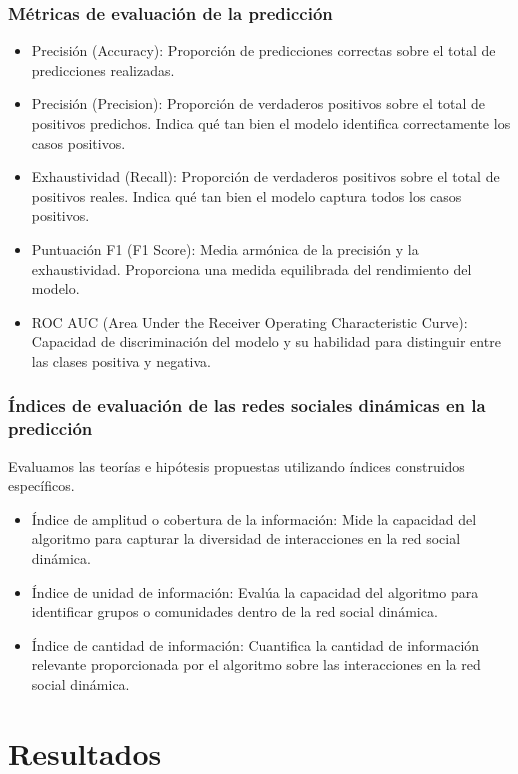 \documentclass{beamer}
\begin{document}
\begin{frame}
	\frametitle{Métricas de evaluación de la predicción}
	\begin{itemize}
		\item Precisión (Accuracy): Proporción de predicciones correctas sobre el total de predicciones realizadas.
		\item Precisión (Precision): Proporción de verdaderos positivos sobre el total de positivos predichos. Indica qué tan bien el modelo identifica correctamente los casos positivos.
		\item Exhaustividad (Recall): Proporción de verdaderos positivos sobre el total de positivos reales. Indica qué tan bien el modelo captura todos los casos positivos.
		\item Puntuación F1 (F1 Score): Media armónica de la precisión y la exhaustividad. Proporciona una medida equilibrada del rendimiento del modelo.
		\item ROC AUC (Area Under the Receiver Operating Characteristic Curve): Capacidad de discriminación del modelo y su habilidad para distinguir entre las clases positiva y negativa.
	\end{itemize}
	
\end{frame}


\begin{frame}
	\frametitle{Índices de evaluación de las redes sociales dinámicas en la predicción}
	\begin{block}{Evaluamos las teorías e hipótesis propuestas utilizando índices construidos específicos.}
	\begin{itemize}
		\item Índice de amplitud o cobertura de la información: Mide la capacidad del algoritmo para capturar la diversidad de interacciones en la red social dinámica.
		\item Índice de unidad de información: Evalúa la capacidad del algoritmo para identificar grupos o comunidades dentro de la red social dinámica.
		\item Índice de cantidad de información: Cuantifica la cantidad de información relevante proporcionada por el algoritmo sobre las interacciones en la red social dinámica.
	\end{itemize}
	\end{block}
\end{frame}



\section{Resultados}
\end{document}
